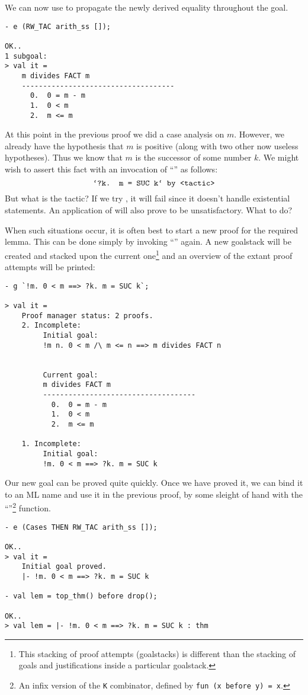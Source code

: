 \noindent We can now use  to propagate the newly derived equality
throughout the goal.
\begin{session}
\begin{verbatim}
- e (RW_TAC arith_ss []);

OK..
1 subgoal:
> val it =
    m divides FACT m
    ------------------------------------
      0.  0 = m - m
      1.  0 < m
      2.  m <= m
\end{verbatim}
\end{session}
    At this point in the previous proof we did a case analysis on $m$.
    However, we already have the hypothesis that $m$ is positive
    (along with two other now useless hypotheses). Thus we know that
    $m$ is the successor of some number $k$. We might wish to assert
    this fact with an invocation of ``'' as follows:
\[
    \mbox{\ml{`?k. m = SUC k` by <tactic>}}
\]
But what is the tactic? If we try , it will fail since
it doesn't handle existential statements. An application of
 will also prove to be unsatisfactory. What to do?

When such situations occur, it is often best to start a new proof for
the required lemma. This can be done simply by invoking ``''
again. A new goalstack will be created and stacked upon the current
one\footnote{This stacking of proof attempts (goalstacks) is different
  than the stacking of goals and justifications inside a particular
  goalstack.}  and an overview of the extant proof attempts will be
printed:
\begin{session}
\begin{verbatim}
- g `!m. 0 < m ==> ?k. m = SUC k`;

> val it =
    Proof manager status: 2 proofs.
    2. Incomplete:
         Initial goal:
         !m n. 0 < m /\ m <= n ==> m divides FACT n


         Current goal:
         m divides FACT m
         ------------------------------------
           0.  0 = m - m
           1.  0 < m
           2.  m <= m

    1. Incomplete:
         Initial goal:
         !m. 0 < m ==> ?k. m = SUC k
\end{verbatim}
\end{session}
    Our new goal can be proved quite quickly. Once we have proved it,
    we can bind it to an ML name and use it in the previous proof, by
    some sleight of hand with the ``''\footnote{An infix
      version of the {\tt K} combinator, defined by {\tt fun (x before
        y) = x}.} function.
\begin{session}
\begin{verbatim}
- e (Cases THEN RW_TAC arith_ss []);

OK..
> val it =
    Initial goal proved.
    |- !m. 0 < m ==> ?k. m = SUC k

- val lem = top_thm() before drop();

OK..
> val lem = |- !m. 0 < m ==> ?k. m = SUC k : thm
\end{verbatim}
\end{session}

